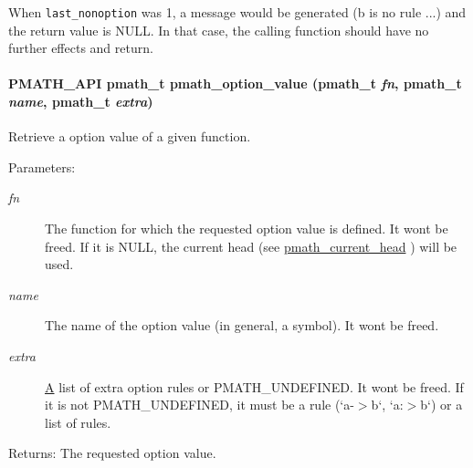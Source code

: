 When {\tt last\_\-nonoption} was 1, a message would be generated (b is no rule ...) and the return value is NULL. In that case, the calling function should have no further effects and return. \hypertarget{group__helpers_gc244ab0720278b396976728a39f8bde6}{
\paragraph[{pmath\_\-option\_\-value}]{\setlength{\rightskip}{0pt plus 5cm}PMATH\_\-API {\bf pmath\_\-t} pmath\_\-option\_\-value ({\bf pmath\_\-t} {\em fn}, \/  {\bf pmath\_\-t} {\em name}, \/  {\bf pmath\_\-t} {\em extra})}\hfill}
\label{group__helpers_gc244ab0720278b396976728a39f8bde6}


Retrieve a option value of a given function. 

\begin{Desc}
\item[Parameters:]
\begin{description}
\item[{\em fn}]The function for which the requested option value is defined. It wont be freed. If it is NULL, the current head (see \hyperlink{group__helpers_g70aa270956b6c8f8eb43431f9775ae88}{pmath\_\-current\_\-head} ) will be used. \item[{\em name}]The name of the option value (in general, a symbol). It wont be freed. \item[{\em extra}]\hyperlink{class_a}{A} list of extra option rules or PMATH\_\-UNDEFINED. It wont be freed. If it is not PMATH\_\-UNDEFINED, it must be a rule (`a-$>$b`, `a:$>$b`) or a list of rules. \end{description}
\end{Desc}
\begin{Desc}
\item[Returns:]The requested option value. \end{Desc}
